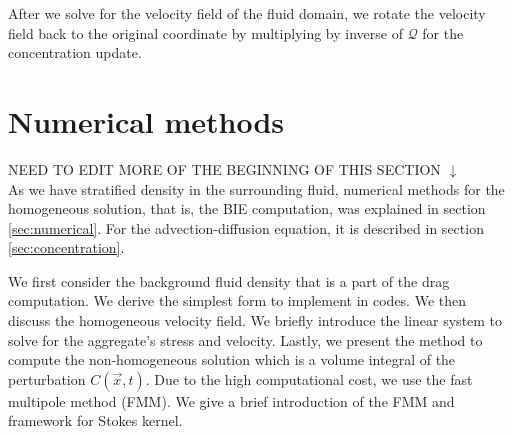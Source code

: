 After we solve for the velocity field of the fluid domain, we rotate the velocity field back to the original coordinate by multiplying by inverse of $\mathcal{Q}$ for the concentration update. 
\section{Numerical methods}
{\color{blue} NEED TO EDIT MORE OF THE BEGINNING OF THIS SECTION $\downarrow$}\\
As we have stratified density in the surrounding fluid, 
numerical methods for the homogeneous solution, that is, the BIE computation, was explained in section \ref{sec:numerical}. For the advection-diffusion equation, it is described in section \ref{sec:concentration}.

We first consider the background fluid density that is a part of the drag computation. We derive the simplest form to implement in codes. We then discuss the homogeneous velocity field. We briefly introduce the linear system to solve for the aggregate's stress and velocity. Lastly, we present the method to compute the non-homogeneous solution which is a volume integral of the perturbation $C(\vec{x},t)$. Due to the high computational cost, we use the fast multipole method (FMM). We give a brief introduction of the FMM and framework for Stokes kernel.
